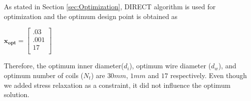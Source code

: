 \documentclass[10pt]{article}
\begin{document}
	As stated in Section \ref{sec:Optimization}, DIRECT algorithm is used for optimization and the optimum design point is obtained as 
	\begin{center}
	$\mathbf{x_{opt}} =
	\left[
	\begin{array}{c}
	 	 .03 \\
	 	 .001 \\
		 17    \\ 
		
	 \end{array}
	 \right]
$	
\end{center}
    Therefore, the optimum inner diameter($d_{i}$), optimum wire diameter ($d_{w}$), and optimum number of coils ($N_{t}$) are $30 mm$, $1 mm$ and $17$ respectively. Even though we added stress relaxation as a constraint, it did not influence the optimum solution.
    
    
\end{document}
